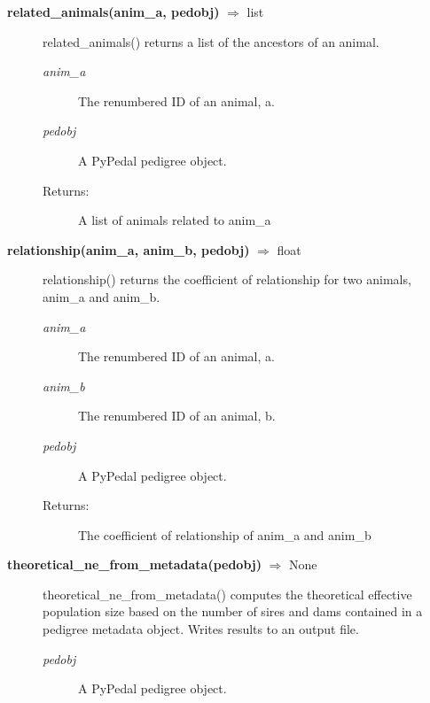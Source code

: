 \begin{description}
\item[\textbf{related\_animals(anim\_a, pedobj)} $\Rightarrow$ list]
related\_animals() returns a list of the ancestors of an animal.
\begin{description}
\item[\emph{anim\_a}] The renumbered ID of an animal, a.
\item[\emph{pedobj}] A PyPedal pedigree object.
\item[Returns:] A list of animals related to anim\_a
\end{description}

\item[\textbf{relationship(anim\_a, anim\_b, pedobj)} $\Rightarrow$ float]
relationship() returns the coefficient of relationship for two animals, anim\_a and anim\_b.
\begin{description}
\item[\emph{anim\_a}] The renumbered ID of an animal, a.
\item[\emph{anim\_b}] The renumbered ID of an animal, b.
\item[\emph{pedobj}] A PyPedal pedigree object.
\item[Returns:] The coefficient of relationship of anim\_a and anim\_b
\end{description}

\item[\textbf{theoretical\_ne\_from\_metadata(pedobj)} $\Rightarrow$ None]
theoretical\_ne\_from\_metadata() computes the theoretical effective population size based on the number of sires and dams contained in a pedigree metadata object. Writes results to an output file.
\begin{description}
\item[\emph{pedobj}] A PyPedal pedigree object.
\end{description}

\end{description}